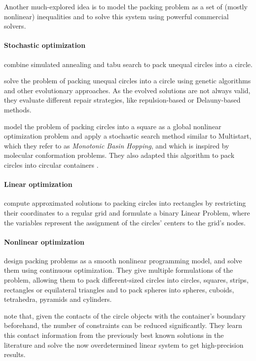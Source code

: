 \documentclass[a4paper,style=print,bibliography=totoc,nexus,lnum,extramargin]{tubsbook}
\begin{document}
Another much-explored idea is to model the packing problem as a set of (mostly nonlinear) inequalities and to solve this system using powerful commercial solvers.

\paragraph{Stochastic optimization}

\textcite{ZD2005effective} combine simulated annealing and tabu search to pack unequal circles into a circle.

\textcite{FMC2015evolutionary} solve the problem of packing unequal circles into a circle using genetic algorithms and other evolutionary approaches. As the evolved solutions are not always valid, they evaluate different repair strategies, like repulsion-based or Delauny-based methods.

\textcite{ALS2008disk} model the problem of packing circles into a square as a global nonlinear optimization problem and apply a stochastic search method similar to Multistart, which they refer to as \emph{Monotonic Basin Hopping}, and which is inspired by molecular conformation problems. They also adapted this algorithm to pack circles into circular containers \cite{GJLS2009solving}.

\paragraph{Linear optimization}

\textcite{LIE2014approximate} compute approximated solutions to packing circles into rectangles by restricting their coordinates to a regular grid and formulate a binary Linear Problem, where the variables represent the assignment of the circles' centers to the grid's nodes.

\paragraph{Nonlinear optimization}

\textcite{BS2008minimizing} design packing problems as a smooth nonlinear programming model, and solve them using continuous optimization. They give multiple formulations of the problem, allowing them to pack different-sized circles into circles, squares, strips, rectangles or equilateral triangles and to pack spheres into spheres, cuboids, tetrahedra, pyramids and cylinders.

\textcite{BG2010new} note that, given the contacts of the circle objects with the container's boundary beforehand, the number of constraints can be reduced significantly. They learn this contact information from the previously best known solutions in the literature and solve the now overdetermined linear system to get high-precision results.
\end{document}

